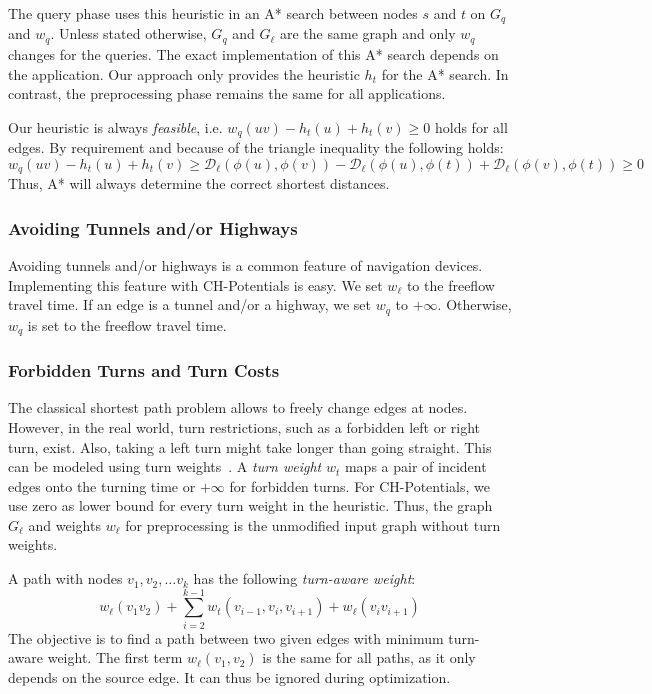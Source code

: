 \documentclass[manuscript,review]{acmart}
\newcommand*{\dist}{\mathcal{D}}
\begin{document}
The query phase uses this heuristic in an A* search between nodes $s$ and $t$ on $G_q$ and $w_q$.
Unless stated otherwise, $G_q$ and $G_\ell$ are the same graph and only $w_q$ changes for the queries.
The exact implementation of this A* search depends on the application.
Our approach only provides the heuristic $h_t$ for the A* search.
In contrast, the preprocessing phase remains the same for all applications.

Our heuristic is always \emph{feasible}, i.e. $w_q(u v) - h_t(u) + h_t(v) \geq 0$ holds for all edges.
By requirement and because of the triangle inequality the following holds:
\[
w_q(u v) - h_t(u) + h_t(v) \geq \dist_\ell(\phi(u), \phi(v)) - \dist_\ell(\phi(u), \phi(t)) + \dist_\ell(\phi(v), \phi(t)) \geq 0
\]
Thus, A* will always determine the correct shortest distances.

\subsubsection{Avoiding Tunnels and/or Highways}
\label{sec:no-tunnel-highway}

Avoiding tunnels and/or highways is a common feature of navigation devices.
Implementing this feature with CH-Potentials is easy.
We set $w_\ell$ to the freeflow travel time.
If an edge is a tunnel and/or a highway, we set $w_q$ to $+\infty$.
Otherwise, $w_q$ is set to the freeflow travel time.

\subsubsection{Forbidden Turns and Turn Costs}
\label{sec:no-turns}

The classical shortest path problem allows to freely change edges at nodes.
However, in the real world, turn restrictions, such as a forbidden left or right turn, exist.
Also, taking a left turn might take longer than going straight.
This can be modeled using turn weights~\cite{gv-errnt-11,dgpw-crprn-13,bwzz-cchtc-20}.
A \emph{turn weight} $w_t$ maps a pair of incident edges onto the turning time or $+\infty$ for forbidden turns.
For CH-Potentials, we use zero as lower bound for every turn weight in the heuristic.
Thus, the graph $G_\ell$ and weights $w_\ell$ for preprocessing is the unmodified input graph without turn weights.

A path with nodes $v_1, v_2,\ldots v_k$ has the following \emph{turn-aware weight}: \[
w_\ell(v_1 v_2) + \sum_{i=2}^{k-1}  w_t(v_{i-1},v_i,v_{i+1}) + w_\ell(v_i v_{i+1})
\]
The objective is to find a path between two given edges with minimum turn-aware weight.
The first term $w_\ell(v_1, v_2)$ is the same for all paths, as it only depends on the source edge.
It can thus be ignored during optimization.
\end{document}
